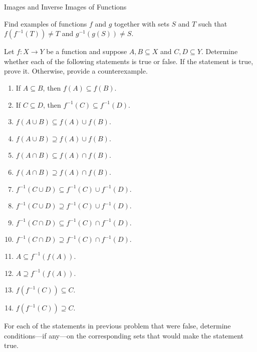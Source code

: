 \begin{section}{Images and Inverse Images of Functions}
\begin{problem}
Find examples of functions $f$ and $g$ together with sets $S$ and $T$ such that $f(f^{-1}(T))\neq T$ and $g^{-1}(g(S))\neq S$.
\end{problem}

\begin{problem}
Let $f:X\to Y$ be a function and suppose $A, B\subseteq X$ and $C, D\subseteq Y$. Determine whether each of the following statements is true or false. If the statement is true, prove it.  Otherwise, provide a counterexample.
\begin{enumerate}[label=\textrm{(\alph*)}]
\item If $A\subseteq B$, then $f(A)\subseteq f(B)$.
\item If $C\subseteq D$, then $f^{-1}(C)\subseteq f^{-1}(D)$.
\item $f(A\cup B)\subseteq f(A)\cup f(B)$.
\item $f(A\cup B)\supseteq f(A)\cup f(B)$.
\item $f(A\cap B)\subseteq f(A)\cap f(B)$.
\item $f(A\cap B)\supseteq f(A)\cap f(B)$.
\item $f^{-1}(C\cup D)\subseteq f^{-1}(C)\cup f^{-1}(D)$.
\item $f^{-1}(C\cup D)\supseteq f^{-1}(C)\cup f^{-1}(D)$.
\item $f^{-1}(C\cap D)\subseteq f^{-1}(C)\cap f^{-1}(D)$.
\item $f^{-1}(C\cap D)\supseteq f^{-1}(C)\cap f^{-1}(D)$.
\item $A\subseteq f^{-1}(f(A))$.
\item $A\supseteq f^{-1}(f(A))$.
\item $f(f^{-1}(C))\subseteq C$.
\item $f(f^{-1}(C))\supseteq C$.
\end{enumerate}
\end{problem}

\begin{exercise}
For each of the statements in previous problem that were false, determine conditions---if any---on the corresponding sets that would make the statement true.
\end{exercise}

\end{section}